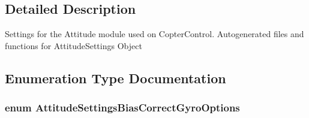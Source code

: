 \subsection{\-Detailed \-Description}
\-Settings for the \-Attitude module used on \-Copter\-Control. \-Autogenerated files and functions for \-Attitude\-Settings \-Object 

\subsection{\-Enumeration \-Type \-Documentation}
\hypertarget{group___attitude_settings_gab83e6a734b8035f678f6842fec277a24}{
\subsubsection[{\-Attitude\-Settings\-Bias\-Correct\-Gyro\-Options}]{\setlength{\rightskip}{0pt plus 5cm}enum {\bf \-Attitude\-Settings\-Bias\-Correct\-Gyro\-Options}}}\label{group___attitude_settings_gab83e6a734b8035f678f6842fec277a24}
